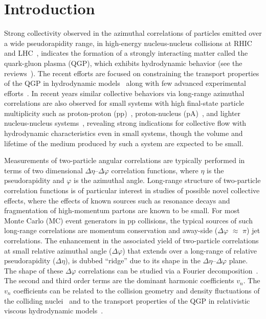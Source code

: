 
\section{Introduction}
\label{sec:intro}

Strong collectivity observed in the azimuthal correlations of particles emitted over a wide pseudorapidity range, in high-energy nucleus-nucleus collisions at RHIC~\cite{Adams:2005dq,Adcox:2004mh,Arsene:2004fa,Back:2004je} and LHC~\cite{Abelev:2012di, Abelev:2014pua, ATLAS:2011ah}, indicates the formation of a strongly interacting matter called the quark-gluon plasma (QGP), which exhibits hydrodynamic behavior (see the reviews~\cite{Romatschke:2007mq,Jeon:2015dfa,Romatschke:2017ejr}). The recent efforts are focused on constraining the transport properties of the QGP in hydrodynamic models~\cite{Niemi:2015qia,Bernhard:2016tnd,Bernhard2019} along with few advanced experimental efforts~\cite{ALICE:2016kpq,Acharya:2017gsw,Acharya:2017zfg,Acharya:2020taj}.
In recent years similar collective behaviors via long-range azimuthal correlations are also observed for small systems with high final-state particle multiplicity such as proton-proton (pp)~\cite{Aad:2015gqa,Khachatryan:2015lva,Khachatryan:2016txc,Acharya:2019vdf}, proton-nucleus (pA)~\cite{Abelev:2012ola,Aad:2014lta,Aaboud:2016yar,Khachatryan:2016ibd}, and lighter nucleus-nucleus systems~\cite{PHENIX:2018lia,Aidala:2017ajz}, revealing strong indications for collective flow with hydrodynamic characteristics even in small systems, though the volume and lifetime of the medium produced by such a system are expected to be small. 

Measurements of two-particle angular correlations are typically performed in terms of two dimensional $\Delta\eta$--$\Delta\varphi$ correlation functions, where $\eta$ is the pseudorapidity and $\varphi$ is the azimuthal angle. Long-range structure of two-particle correlation functions is of particular interest in studies of possible novel collective effects, where the effects of known sources such as resonance decays and fragmentation of high-momentum partons are known to be small. For most Monte Carlo (MC) event generators in pp collisions, the typical sources of such long-range correlations are momentum conservation and away-side ($\Delta\varphi$ $\approx$ $\pi$) jet correlations.
The enhancement in the associated yield of two-particle correlations at small relative azimuthal angle ($\Delta\varphi$) that extends over a long-range of relative pseudorapidity ($\Delta\eta$), is dubbed ``ridge'' due to its shape in the $\Delta\eta$--$\Delta\varphi$ plane.
The shape of these $\Delta\varphi$ correlations can be studied via a Fourier decomposition~\cite{Poskanzer:1998yz,Voloshin:2008dg}. The second and third order terms are the dominant harmonic coefficients $v_n$. The $v_n$ coefficients can be related to the collision geometry and density fluctuations of the colliding nuclei~\cite{Alver:2010gr,Alver:2010dn,ALICE:2011ab} and to the transport properties of the QGP in relativistic viscous hydrodynamic models~\cite{Gale:2012rq,Niemi:2015qia,Shen:2014vra,Bernhard:2016tnd,Bernhard2019}.

